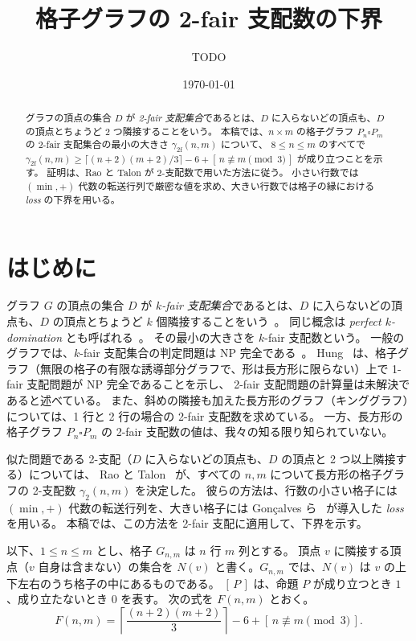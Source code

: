 \documentclass[11pt]{ltjsarticle}
\title{格子グラフの 2-fair 支配数の下界}
\author{TODO}
\date{\today}
\theoremstyle{definition}
\newcommand{\gf}{\gamma_{2\mathrm{f}}}
\newcommand{\iv}[1]{[\,#1\,]}
\begin{document}
\maketitle

\begin{abstract}
グラフの頂点の集合 $D$ が \emph{2-fair 支配集合}であるとは、$D$ に入らないどの頂点も、$D$ の頂点とちょうど 2 つ隣接することをいう。
本稿では、$n\times m$ の格子グラフ $P_n \square P_m$ の 2-fair 支配集合の最小の大きさ $\gf(n,m)$ について、
$8\le n\le m$ のすべてで
$\gf(n,m)\ge \lceil (n+2)(m+2)/3\rceil-6+\iv{n\not\equiv m \pmod 3}$
が成り立つことを示す。
証明は、Rao と Talon が 2-支配数で用いた方法に従う。
小さい行数では $(\min,+)$ 代数の転送行列で厳密な値を求め、大きい行数では格子の縁における \emph{loss} の下界を用いる。
\end{abstract}

\section{はじめに}

グラフ $G$ の頂点の集合 $D$ が \emph{$k$-fair 支配集合}であるとは、$D$ に入らないどの頂点も、$D$ の頂点とちょうど $k$ 個隣接することをいう~\cite{CHH}。
同じ概念は \emph{perfect $k$-domination} とも呼ばれる~\cite{CCV}。
その最小の大きさを $k$-fair 支配数という。
一般のグラフでは、$k$-fair 支配集合の判定問題は NP 完全である~\cite[定理 16]{CCV}。
Hung~\cite{Hung} は、格子グラフ（無限の格子の有限な誘導部分グラフで、形は長方形に限らない）上で 1-fair 支配問題が NP 完全であることを示し、
2-fair 支配問題の計算量は未解決であると述べている。
また、斜めの隣接も加えた長方形のグラフ（キンググラフ）については、1 行と 2 行の場合の 2-fair 支配数を求めている。
一方、長方形の格子グラフ $P_n\square P_m$ の 2-fair 支配数の値は、我々の知る限り知られていない。

似た問題である 2-支配（$D$ に入らないどの頂点も、$D$ の頂点と 2 つ以上隣接する）については、
Rao と Talon~\cite{RT} が、すべての $n,m$ について長方形の格子グラフの 2-支配数 $\gamma_2(n,m)$ を決定した。
彼らの方法は、行数の小さい格子には $(\min,+)$ 代数の転送行列を、大きい格子には Gon\c{c}alves ら~\cite{GPRT} が導入した \emph{loss} を用いる。
本稿では、この方法を 2-fair 支配に適用して、下界を示す。

以下、$1\le n\le m$ とし、格子 $G_{n,m}$ は $n$ 行 $m$ 列とする。
頂点 $v$ に隣接する頂点（$v$ 自身は含まない）の集合を $N(v)$ と書く。$G_{n,m}$ では、$N(v)$ は $v$ の上下左右のうち格子の中にあるものである。
$\iv{P}$ は、命題 $P$ が成り立つとき $1$、成り立たないとき $0$ を表す。
次の式を $F(n,m)$ とおく。
\[
F(n,m)=\left\lceil\frac{(n+2)(m+2)}{3}\right\rceil-6+\iv{n\not\equiv m \pmod 3}.
\]
\end{document}
